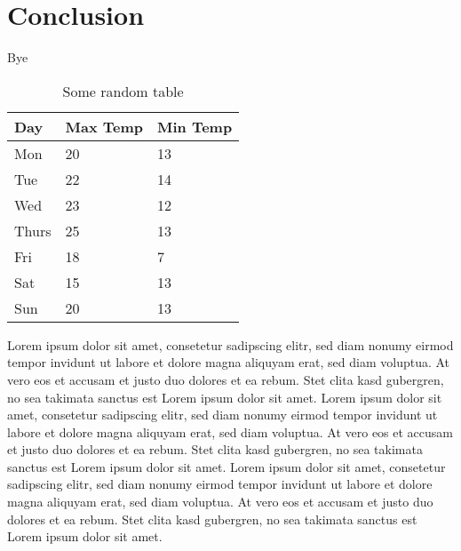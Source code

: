 \chapter{Conclusion}
\label{ch:Conclusion}

Bye
\begin{table}[]
	\centering
	\begin{tabular}{l | l | l}
		Day & Max Temp & Min Temp \\
		\hline \hline
		Mon & 20 & 13\\
		Tue & 22 & 14\\
		Wed & 23 & 12\\
		Thurs & 25 & 13\\
		Fri & 18 & 7\\
		Sat & 15 & 13\\
		Sun & 20 & 13
	\end{tabular}
	\caption{Some random table}
	\label{tab:temps}
\end{table}
Lorem ipsum dolor sit amet, consetetur sadipscing elitr, sed diam nonumy eirmod tempor invidunt ut labore et dolore magna aliquyam erat, sed diam voluptua. At vero eos et accusam et justo duo dolores et ea rebum. Stet clita kasd gubergren, no sea takimata sanctus est Lorem ipsum dolor sit amet. Lorem ipsum dolor sit amet, consetetur sadipscing elitr, sed diam nonumy eirmod tempor invidunt ut labore et dolore magna aliquyam erat, sed diam voluptua. At vero eos et accusam et justo duo dolores et ea rebum. Stet clita kasd gubergren, no sea takimata sanctus est Lorem ipsum dolor sit amet. Lorem ipsum dolor sit amet, consetetur sadipscing elitr, sed diam nonumy eirmod tempor invidunt ut labore et dolore magna aliquyam erat, sed diam voluptua. At vero eos et accusam et justo duo dolores et ea rebum. Stet clita kasd gubergren, no sea takimata sanctus est Lorem ipsum dolor sit amet.